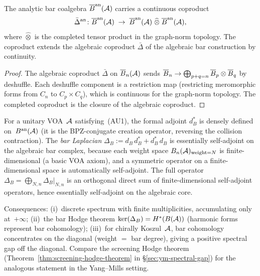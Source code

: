 \begin{proposition}%
%
The analytic bar coalgebra $\overline{B}^{\mathrm{an}}(\mathcal{A})$ carries a continuous
coproduct
\begin{equation}%
\bar{\Delta}^{\mathrm{an}} \colon
\anbar(\cA)
\;\to\;
\anbar(\cA)
\;\widehat{\otimes}\;
\anbar(\cA),
\end{equation}
where $\widehat{\otimes}$ is the completed tensor product
in the graph-norm topology. The coproduct extends the algebraic
coproduct $\bar{\Delta}$ of the algebraic bar construction
by continuity.
\end{proposition}

\begin{proof}
The algebraic coproduct $\bar{\Delta}$ on $\overline{B}_n(\mathcal{A})$
sends $\overline{B}_n \to \bigoplus_{p+q=n} \overline{B}_p \otimes \overline{B}_q$
by deshuffle. Each deshuffle component is a restriction map
(restricting meromorphic forms from $C_n$ to
$C_p \times C_q$), which is continuous for the graph-norm
topology. The completed coproduct is the closure of the
algebraic coproduct.
\end{proof}

\begin{remark}%
\label{rem:bar-laplacian-hodge}%
%
For a unitary VOA~$\mathcal{A}$ satisfying~(AU1), the formal adjoint
$d_B^*$ is densely defined on~$B^{\mathrm{an}}(\mathcal{A})$
(it is the BPZ-conjugate creation operator, reversing the
collision contraction). The \emph{bar Laplacian}
$\Delta_B := d_B\,d_B^* + d_B^*\,d_B$
is essentially self-adjoint on the algebraic bar complex, because
each weight space $B_n(\mathcal{A})_{\mathrm{weight}=N}$ is
finite-dimensional (a basic VOA axiom), and a symmetric operator
on a finite-dimensional space is automatically self-adjoint.
The full operator
$\Delta_B = \bigoplus_{N,n} \Delta_B|_{N,n}$
is an orthogonal direct sum of finite-dimensional self-adjoint
operators, hence essentially self-adjoint on the algebraic core.

Consequences: (i)~discrete spectrum with finite multiplicities,
accumulating only at~$+\infty$;
(ii)~the bar Hodge theorem
$\ker(\Delta_B) = H^*(B(\mathcal{A}))$
(harmonic forms represent bar cohomology);
(iii)~for chirally Koszul~$\mathcal{A}$, bar cohomology concentrates on
the diagonal (weight $=$ bar degree), giving a positive spectral
gap off the diagonal. Compare the screening Hodge theorem
(Theorem~\ref{thm:screening-hodge-theorem} in
\S\ref{sec:ym-spectral-gap}) for the analogous statement in the
Yang--Mills setting.
\end{remark}

